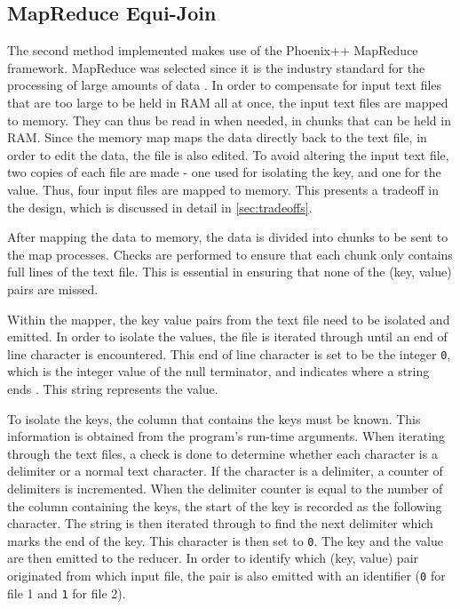 \documentclass[10pt,twocolumn]{witseiepaper}
\begin{document}
\subsection{MapReduce Equi-Join}
The second method implemented makes use of the Phoenix++ MapReduce framework. MapReduce was selected since it is the industry standard for the processing of large amounts of data \cite{comparingMPIMapReduce}. In order to compensate for input text files that are too large to be held in RAM all at once, the input text files are mapped to memory. They can thus be read in when needed, in chunks that can be held in RAM. Since the memory map maps the data directly back to the text file, in order to edit the data, the file is also edited. To avoid altering the input text file, two copies of each file are made - one used for isolating the key, and one for the value. Thus, four input files are mapped to memory. This presents a tradeoff in the design, which is discussed in detail in \ref{sec:tradeoffs}.

After mapping the data to memory, the data is divided into chunks to be sent to the map processes. Checks are performed to ensure that each chunk only contains full lines of the text file. This is essential in ensuring that none of the (key, value) pairs are missed.

Within the mapper, the key value pairs from the text file need to be isolated and emitted. In order to isolate the values, the file is iterated through until an end of line character is encountered. This end of line character is set to be the integer \texttt{0}, which is the integer value of the null terminator, and indicates where a string ends \cite{phoenix}. This string represents the value.

To isolate the keys, the column that contains the keys must be known. This information is obtained from the program's run-time arguments. When iterating through the text files, a check is done to determine whether each character is a delimiter or a normal text character. If the character is a delimiter, a counter of delimiters is incremented. When the delimiter counter is equal to the number of the column containing the keys, the start of the key is recorded as the following character. The string is then iterated through to find the next delimiter which marks the end of the key. This character is then set to \texttt{0}. The key and the value are then emitted to the reducer. In order to identify which (key, value) pair originated from which input file, the pair is also emitted with an identifier (\texttt{0} for file 1 and \texttt{1} for file 2).
\end{document}
